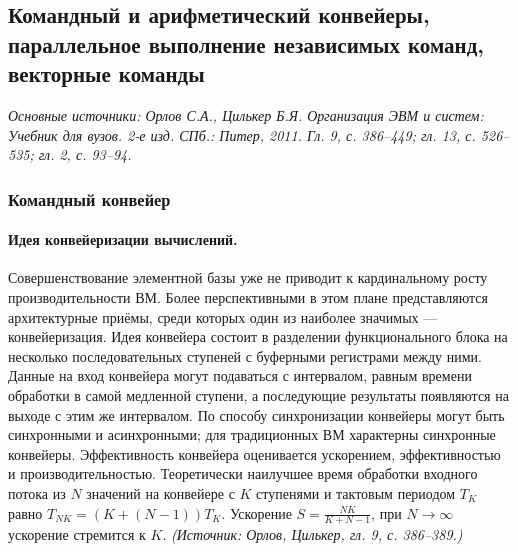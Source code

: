 \documentclass[a4paper,12pt]{article}
\begin{document}
\subsection{Командный и арифметический конвейеры, параллельное выполнение независимых команд, векторные команды}

\noindent\textit{Основные источники: Орлов С.А., Цилькер Б.Я. Организация ЭВМ и систем: Учебник для вузов. 2-е изд. СПб.: Питер, 2011. Гл. 9, с. 386--449; гл. 13, с. 526--535; гл. 2, с. 93--94.}

\subsubsection{Командный конвейер}

\paragraph{Идея конвейеризации вычислений.}
Совершенствование элементной базы уже не приводит к кардинальному росту производительности ВМ. Более перспективными в этом плане представляются архитектурные приёмы, среди которых один из наиболее значимых --- конвейеризация. Идея конвейера состоит в разделении функционального блока на несколько последовательных ступеней с буферными регистрами между ними. Данные на вход конвейера могут подаваться с интервалом, равным времени обработки в самой медленной ступени, а последующие результаты появляются на выходе с этим же интервалом. По способу синхронизации конвейеры могут быть синхронными и асинхронными; для традиционных ВМ характерны синхронные конвейеры. Эффективность конвейера оценивается ускорением, эффективностью и производительностью. Теоретически наилучшее время обработки входного потока из \(N\) значений на конвейере с \(K\) ступенями и тактовым периодом \(T_K\) равно \(T_{NK}=(K+(N-1))T_K\). Ускорение \(S=\frac{NK}{K+N-1}\), при \(N\to\infty\) ускорение стремится к \(K\).
\textit{(Источник: Орлов, Цилькер, гл. 9, с. 386--389.)}
\end{document}
